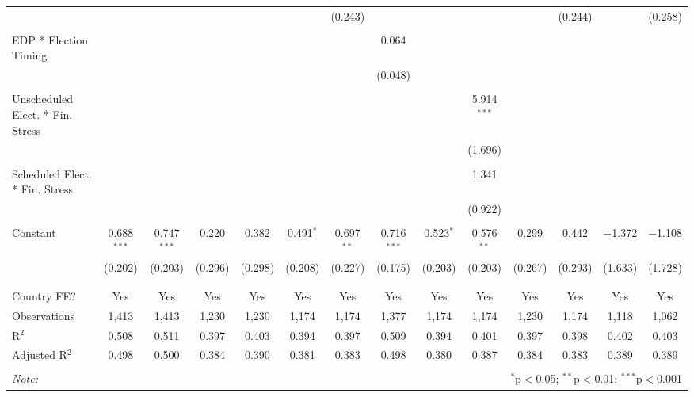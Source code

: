 \begin{table}[!htbp]
\begin{tabular}{@{\extracolsep{5pt}}lccccccccccccc}
  &  &  &  &  &  & (0.243) &  &  &  &  & (0.244) &  & (0.258) \\ 
  & & & & & & & & & & & & & \\ 
 EDP * Election Timing &  &  &  &  &  &  & 0.064 &  &  &  &  &  &  \\ 
  &  &  &  &  &  &  & (0.048) &  &  &  &  &  &  \\ 
  & & & & & & & & & & & & & \\ 
 Unscheduled Elect. * Fin. Stress &  &  &  &  &  &  &  &  & 5.914$^{***}$ &  &  &  &  \\ 
  &  &  &  &  &  &  &  &  & (1.696) &  &  &  &  \\ 
  & & & & & & & & & & & & & \\ 
 Scheduled Elect. * Fin. Stress &  &  &  &  &  &  &  &  & 1.341 &  &  &  &  \\ 
  &  &  &  &  &  &  &  &  & (0.922) &  &  &  &  \\ 
  & & & & & & & & & & & & & \\ 
 Constant & 0.688$^{***}$ & 0.747$^{***}$ & 0.220 & 0.382 & 0.491$^{*}$ & 0.697$^{**}$ & 0.716$^{***}$ & 0.523$^{*}$ & 0.576$^{**}$ & 0.299 & 0.442 & $-$1.372 & $-$1.108 \\ 
  & (0.202) & (0.203) & (0.296) & (0.298) & (0.208) & (0.227) & (0.175) & (0.203) & (0.203) & (0.267) & (0.293) & (1.633) & (1.728) \\ 
  & & & & & & & & & & & & & \\ 
\hline \\[-1.8ex] 
Country FE? & Yes & Yes & Yes & Yes & Yes & Yes & Yes & Yes & Yes & Yes & Yes & Yes & Yes \\ 
Observations & 1,413 & 1,413 & 1,230 & 1,230 & 1,174 & 1,174 & 1,377 & 1,174 & 1,174 & 1,230 & 1,174 & 1,118 & 1,062 \\ 
R$^{2}$ & 0.508 & 0.511 & 0.397 & 0.403 & 0.394 & 0.397 & 0.509 & 0.394 & 0.401 & 0.397 & 0.398 & 0.402 & 0.403 \\ 
Adjusted R$^{2}$ & 0.498 & 0.500 & 0.384 & 0.390 & 0.381 & 0.383 & 0.498 & 0.380 & 0.387 & 0.384 & 0.383 & 0.389 & 0.389 \\ 
\hline 
\hline \\[-1.8ex] 
\textit{Note:}  & \multicolumn{13}{r}{$^{*}$p$<$0.05; $^{**}$p$<$0.01; $^{***}$p$<$0.001} \\ 
\end{tabular} 
\end{table} 
